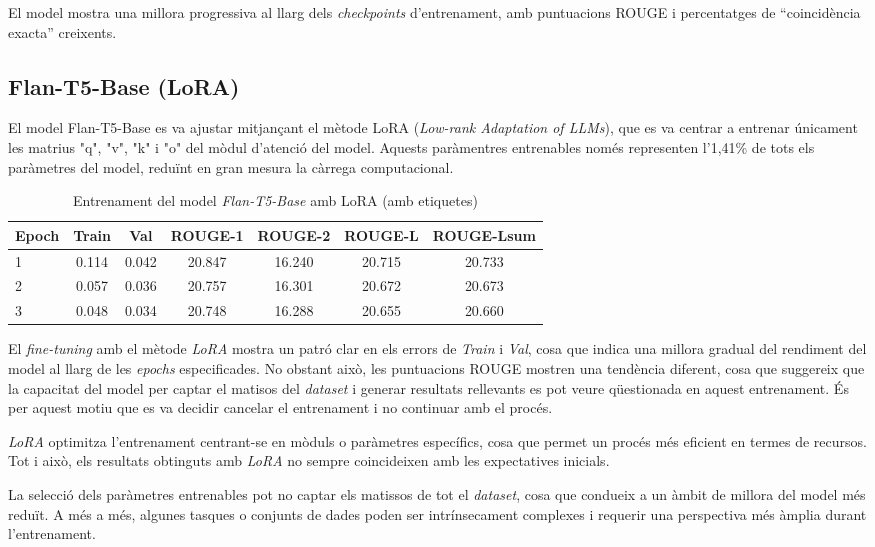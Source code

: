 El model mostra una millora progressiva al llarg dels \textit{checkpoints} d'entrenament, amb puntuacions ROUGE i percentatges de ``coincidència exacta'' creixents.

\subsection{Flan-T5-Base (LoRA)}
El model Flan-T5-Base es va ajustar mitjançant el mètode LoRA (\textit{Low-rank Adaptation of LLMs}), que es va centrar a entrenar únicament les matrius "q", "v", "k" i "o" del mòdul d'atenció del model. Aquests paràmentres entrenables només representen l'1,41\% de tots els paràmetres del model, reduïnt en gran mesura la càrrega computacional.
\begin{table}[H]
    \centering
    \label{tab:additional-training}
    \begin{tabular}{lcccccc}
    \toprule
    Epoch & Train & Val & ROUGE-1 & ROUGE-2 & ROUGE-L & ROUGE-Lsum \\
    \midrule
    1 & 0.114 & 0.042 & 20.847 & 16.240 & 20.715 & 20.733 \\
    2 & 0.057 & 0.036 & 20.757 & 16.301 & 20.672 & 20.673 \\
    3 & 0.048 & 0.034 & 20.748 & 16.288 & 20.655 & 20.660 \\
    \bottomrule
    \end{tabular}
    \caption[Entrenament del model \textit{Flan-T5-Base} amb LoRA]{Entrenament del model \textit{Flan-T5-Base} amb LoRA (amb etiquetes)}
\end{table}
El \textit{fine-tuning} amb el mètode \textit{LoRA} mostra un patró clar en els errors de \textit{Train} i \textit{Val}, cosa que indica una millora gradual del rendiment del model al llarg de les \textit{epochs} especificades. No obstant això, les puntuacions ROUGE mostren una tendència diferent, cosa que suggereix que la capacitat del model per captar el matisos del \textit{dataset} i generar resultats rellevants es pot veure qüestionada en aquest entrenament. És per aquest motiu que es va decidir cancelar el entrenament i no continuar amb el procés.

\textit{LoRA} optimitza l'entrenament centrant-se en mòduls o paràmetres específics, cosa que permet un procés més eficient en termes de recursos. Tot i això, els resultats obtinguts amb \textit{LoRA} no sempre coincideixen amb les expectatives inicials. 

La selecció dels paràmetres entrenables pot no captar els matissos de tot el \textit{dataset}, cosa que condueix a un àmbit de millora del model més reduït. A més a més, algunes tasques o conjunts de dades poden ser intrínsecament complexes i requerir una perspectiva més àmplia durant l'entrenament. 
